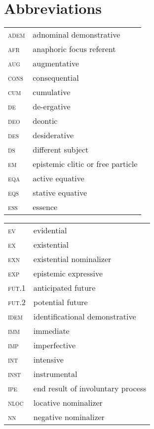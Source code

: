 \documentclass[output=paper]{langsci/langscibook}
\begin{document}
\section*{Abbreviations}
\begin{tabularx}{.45\textwidth}{lQ}
\textsc{adem} & adnominal demonstrative\\ 
\textsc{afr} & anaphoric focus referent\\ 
\textsc{aug} & augmentative\\ 
\textsc{cons} & consequential\\ 
\textsc{cum} & cumulative\\
\textsc{de} & de-ergative\\ 
\textsc{deo} & deontic\\ 
\textsc{des} & desiderative\\ 
\textsc{ds} & different subject\\
\textsc{em} & epistemic clitic or free particle\\
\textsc{eqa} & active equative\\ 
\textsc{eqs} & stative equative\\
\textsc{ess} & essence\\
\end{tabularx}
\begin{tabularx}{.54\textwidth}{lQ}
\textsc{ev} & evidential\\ %
\textsc{ex} & existential\\ 
\textsc{exn} & existential nominalizer\\ 
\textsc{exp} & epistemic expressive\\ 
\textsc{fut}.1 & anticipated future\\ 
\textsc{fut}.2 & potential future\\ 
\textsc{idem} & identificational demonstrative\\ 
\textsc{imm} & immediate\\
\textsc{imp} & imperfective\\
\textsc{int} & intensive\\
\textsc{inst} & instrumental\\
\textsc{ipe} & end result of involuntary process\\
\textsc{nloc} & locative nominalizer\\
\textsc{nn} & negative nominalizer\\ 
\end{tabularx}
\end{document}
